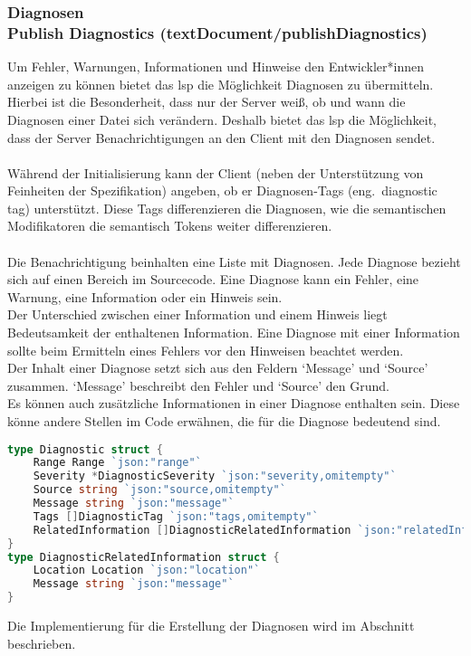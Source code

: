 \documentclass[./einleitung.tex]{subfiles}
\begin{document}
    \subsubsection[Diagnosen]{Diagnosen\\ {\textnormal{\footnotesize Publish Diagnostics (textDocument/publishDiagnostics) \cite{diagnostics}}}}\label{subsubsec:diagnostics}
    Um Fehler, Warnungen, Informationen und Hinweise den Entwickler*innen anzeigen zu können bietet das \acrshort{lsp} die Möglichkeit Diagnosen zu übermitteln.
    Hierbei ist die Besonderheit, dass nur der Server weiß, ob und wann die Diagnosen einer Datei sich verändern.
    Deshalb bietet das \acrshort{lsp} die Möglichkeit, dass der Server Benachrichtigungen an den Client mit den Diagnosen sendet.
    \\\\
    Während der Initialisierung kann der Client (neben der Unterstützung von Feinheiten der Spezifikation) angeben, ob er Diagnosen-Tags (eng.\ diagnostic tag) unterstützt.
    Diese Tags differenzieren die Diagnosen, wie die semantischen Modifikatoren die semantisch Tokens weiter differenzieren.
    \\\\
    Die Benachrichtigung beinhalten eine Liste mit Diagnosen.
    Jede Diagnose bezieht sich auf einen Bereich im Sourcecode.
    Eine Diagnose kann ein Fehler, eine Warnung, eine Information oder ein Hinweis sein.\\
    Der Unterschied zwischen einer Information und einem Hinweis liegt Bedeutsamkeit der enthaltenen Information.
    Eine Diagnose mit einer Information sollte beim Ermitteln eines Fehlers vor den Hinweisen beachtet werden.\\
    Der Inhalt einer Diagnose setzt sich aus den Feldern `Message' und `Source' zusammen.
    `Message' beschreibt den Fehler und `Source' den Grund.\\
    Es können auch zusätzliche Informationen in einer Diagnose enthalten sein.
    Diese könne andere Stellen im Code erwähnen, die für die Diagnose bedeutend sind.
    \begin{lstlisting}[language=Go, caption=Definition des Inhalts der Benachrichtigung, label=lst:diagnostics-result]
type Diagnostic struct {
	Range Range `json:"range"`
	Severity *DiagnosticSeverity `json:"severity,omitempty"`
  	Source string `json:"source,omitempty"`
	Message string `json:"message"`
	Tags []DiagnosticTag `json:"tags,omitempty"`
	RelatedInformation []DiagnosticRelatedInformation `json:"relatedInformation,omitempty"`
}
type DiagnosticRelatedInformation struct {
	Location Location `json:"location"`
	Message string `json:"message"`
}
    \end{lstlisting}
    Die Implementierung für die Erstellung der Diagnosen wird im Abschnitt  beschrieben.
\end{document}
